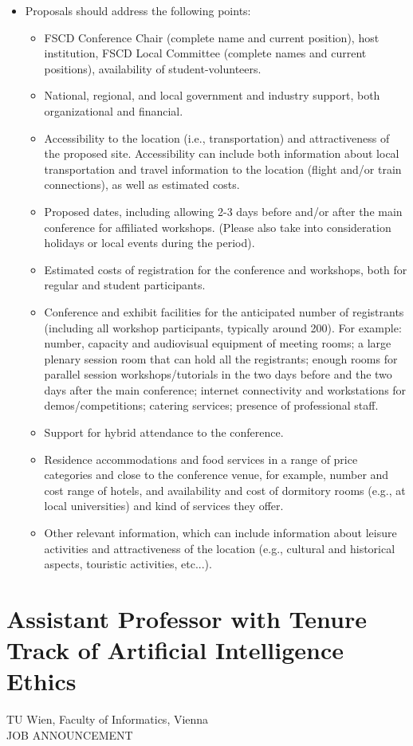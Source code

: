 \documentclass[prodmode,acmtecs]{acmsmall} %
\begin{document}
\begin{itemize}
\item  Proposals should address the following points: 
 
\begin{itemize}\item  FSCD Conference Chair (complete name and current position), host institution, FSCD Local Committee (complete names and current positions), availability of student-volunteers.
\item  National, regional, and local government and industry support, both organizational and financial.
\item  Accessibility to the location (i.e., transportation) and attractiveness of the proposed site. Accessibility can include both information about local transportation and travel information to the location (flight and/or train connections), as well as estimated costs.
\item  Proposed dates, including allowing 2-3 days before and/or after the main conference for affiliated workshops. (Please also take into consideration holidays or local events during the period).
\item  Estimated costs of registration for the conference and workshops, both for regular and student participants.
\item  Conference and exhibit facilities for the anticipated number of registrants (including all workshop participants, typically around 200). For example: number, capacity and audiovisual equipment of meeting rooms; a large plenary session room that can hold all the registrants; enough rooms for parallel session workshops/tutorials in the two days before and the two days after the main conference; internet connectivity and workstations for demos/competitions; catering services; presence of professional staff.
\item  Support for hybrid attendance to the conference.
\item  Residence accommodations and food services in a range of price categories and close to the conference venue, for example, number and cost range of hotels, and availability and cost of dormitory rooms (e.g., at local universities) and kind of services they offer.
\item  Other relevant information, which can include information about leisure activities and attractiveness of the location (e.g., cultural and historical aspects, touristic activities, etc...).
\end{itemize} 
\end{itemize}\section{Assistant Professor with Tenure Track of Artificial Intelligence Ethics}\label{AssistantProfessorwithTenureTrackofArtificialIntelligenceEthics}  TU Wien, Faculty of Informatics, Vienna\\ 
JOB ANNOUNCEMENT 
\end{document}
